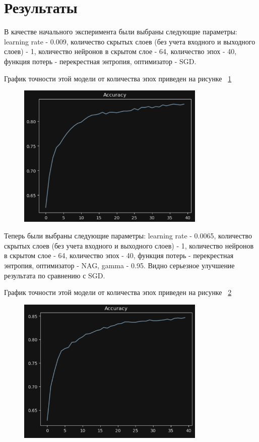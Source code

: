 \documentclass[a4paper, 14pt]{extarticle}
\begin{document}
\section{Результаты}

В качестве начального эксперимента были выбраны следующие параметры: learning rate - 0.009, количество скрытых слоев (без учета входного и выходного слоев) - 1, количество нейронов в скрытом слое - 64, количество эпох - 40, функция потерь - перекрестная энтропия, оптимизатор - SGD.

График точности этой модели от количества эпох приведен на рисунке ~\ref{fig:img1}

\begin{figure}[H]
\centering
\includegraphics[width=0.8\textwidth]{images/res1.png}
\caption{}
\label{fig:img1}
\end{figure}

Теперь были выбраны следующие параметры: learning rate - 0.0065, количество скрытых слоев (без учета входного и выходного слоев) - 1, количество нейронов в скрытом слое - 64, количество эпох - 40, функция потерь - перекрестная энтропия, оптимизатор - NAG, gamma - 0.95. Видно серьезное улучшение результата по сравнению с SGD.

График точности этой модели от количества эпох приведен на рисунке ~\ref{fig:img2}

\begin{figure}[H]
\centering
\includegraphics[width=0.8\textwidth]{images/res2.png}
\caption{}
\label{fig:img2}
\end{figure}
\end{document}
